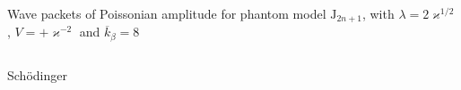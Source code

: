 \documentclass[9pt]{beamer}
\begin{document}
\begin{frame}%
{Wave packets of Poissonian amplitude for phantom model}%
{$\mathrm{J}_{2n+1}$, with $\lambda = 2\varkappa^{1/2}$,
$V = +\varkappa^{-2}$ and $\overline{k}_\beta = 8$}
\begin{columns}
\begin{column}{.49\textwidth}
\begin{block}{Schödinger}

\end{block}
\end{column}
\end{columns}
\end{frame}
\end{document}

